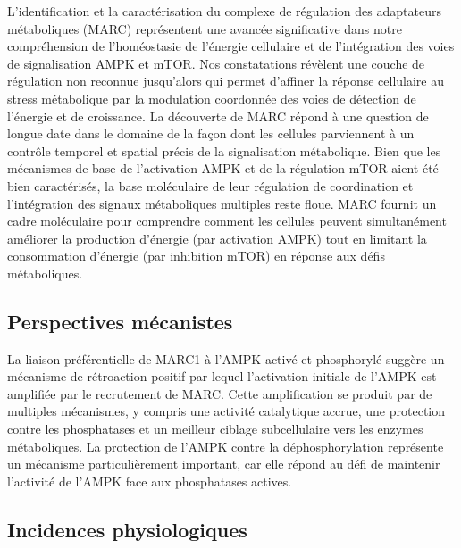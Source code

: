\documentclass[11pt,a4paper]{article}
\begin{document}
L'identification et la caractérisation du complexe de régulation des adaptateurs métaboliques (MARC) représentent une avancée significative dans notre compréhension de l'homéostasie de l'énergie cellulaire et de l'intégration des voies de signalisation AMPK et mTOR. Nos constatations révèlent une couche de régulation non reconnue jusqu'alors qui permet d'affiner la réponse cellulaire au stress métabolique par la modulation coordonnée des voies de détection de l'énergie et de croissance. La découverte de MARC répond à une question de longue date dans le domaine de la façon dont les cellules parviennent à un contrôle temporel et spatial précis de la signalisation métabolique. Bien que les mécanismes de base de l'activation AMPK et de la régulation mTOR aient été bien caractérisés, la base moléculaire de leur régulation de coordination et l'intégration des signaux métaboliques multiples reste floue. MARC fournit un cadre moléculaire pour comprendre comment les cellules peuvent simultanément améliorer la production d'énergie (par activation AMPK) tout en limitant la consommation d'énergie (par inhibition mTOR) en réponse aux défis métaboliques.

\subsection{Perspectives mécanistes}

La liaison préférentielle de MARC1 à l'AMPK activé et phosphorylé suggère un mécanisme de rétroaction positif par lequel l'activation initiale de l'AMPK est amplifiée par le recrutement de MARC. Cette amplification se produit par de multiples mécanismes, y compris une activité catalytique accrue, une protection contre les phosphatases et un meilleur ciblage subcellulaire vers les enzymes métaboliques. La protection de l'AMPK contre la déphosphorylation représente un mécanisme particulièrement important, car elle répond au défi de maintenir l'activité de l'AMPK face aux phosphatases actives.

\subsection{Incidences physiologiques}
\end{document}
